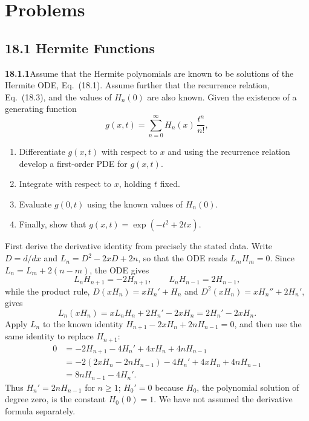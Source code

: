 
\section*{Problems}


\subsection*{18.1 Hermite Functions}

\par\bigskip
\noindent\textbf{18.1.1}\quad Assume that the Hermite polynomials are
known to be solutions of the Hermite ODE, Eq.~(18.1). Assume further
that the recurrence relation, Eq.~(18.3), and the values of $H_{n}(0)$
are also known. Given the existence of a generating function
\[
g(x,t)=\sum_{n=0}^{\infty}H_{n}(x)\,\frac{t^{n}}{n!},
\]
\begin{enumerate}
\item[(a)] Differentiate $g(x,t)$ with respect to $x$ and using the
recurrence relation develop a first-order PDE for $g(x,t)$.
\item[(b)] Integrate with respect to $x$, holding $t$ fixed.
\item[(c)] Evaluate $g(0,t)$ using the known values of $H_{n}(0)$.
\item[(d)] Finally, show that $g(x,t)=\exp(-t^{2}+2tx)$.
\end{enumerate}
\solution
{}\par

First derive the derivative identity from precisely the stated data.
Write $D=d/dx$ and $L_n=D^2-2xD+2n$, so that the ODE reads $L_mH_m=0$.
Since $L_n=L_m+2(n-m)$, the ODE gives
\[
L_nH_{n+1}=-2H_{n+1},\qquad L_nH_{n-1}=2H_{n-1},
\]
while the product rule, $D(xH_n)=xH_n'+H_n$ and
$D^2(xH_n)=xH_n''+2H_n'$, gives
\[
L_n(xH_n)=xL_nH_n+2H_n'-2xH_n=2H_n'-2xH_n.
\]
Apply $L_n$ to the known identity
$H_{n+1}-2xH_n+2nH_{n-1}=0$, and then use the same identity to
replace $H_{n+1}$:
\begin{align*}
0&=-2H_{n+1}-4H_n'+4xH_n+4nH_{n-1}\\
 &=-2(2xH_n-2nH_{n-1})-4H_n'+4xH_n+4nH_{n-1}\\
 &=8nH_{n-1}-4H_n'.
\end{align*}
Thus $H_n'=2nH_{n-1}$ for $n\ge1$; $H_0'=0$ because $H_0$, the
polynomial solution of degree zero, is the constant $H_0(0)=1$.  We have
not assumed the derivative formula separately.

